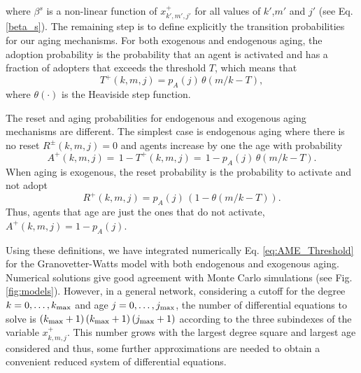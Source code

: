 where $\beta^s$ is a non-linear function of $x^{+}_{k',m',j'}$ for all values of $k'$,$m'$ and $j'$  (see Eq. \eqref{beta_s}). The remaining step is to define explicitly the transition probabilities for our aging mechanisms. For both exogenous and endogenous aging, the adoption probability is the probability that an agent is activated and has a fraction of adopters that exceeds the threshold $T$, which means that 
\begin{equation}
T^{+}(k,m,j) = p_A(j) \, \theta(m/k - T),
\end{equation} 
where $\theta(\cdot)$ is the Heaviside step function. 

The reset and aging probabilities for endogenous and exogenous aging mechanisms are different. The simplest case is endogenous aging where there is no reset $R^{\pm} (k,m,j) = 0$ and agents increase by one the age with probability 
\begin{equation}
A^{+} (k,m,j) = \,  1 - T^{+}(k,m,j) = \, 1 - p_{A}(j)\, \theta \left( m/k - T \right).
\end{equation}
When aging is exogenous, the reset probability is the probability to activate and not adopt 
\begin{equation}
R^{+} (k,m,j) = p_A (j)\, \left(1 - \theta \left(m/k - T\right)\right). 
\end{equation}
Thus, agents that age are just the ones that do not activate, $A^{+} (k,m,j) = 1 - p_A(j)$.

Using these definitions, we have integrated numerically Eq. \eqref{eq:AME_Threshold} for the Granovetter-Watts model with both endogenous and exogenous aging. Numerical solutions give  good agreement with Monte Carlo simulations (see Fig. \ref{fig:models}). However, in a general network, considering a cutoff for the degree $k = 0,\dots,k_{\rm{max}}$ and age $j = 0,\dots,j_{\rm{max}}$, the number of differential equations to solve is $(k_{\rm{max}} + 1)\, (k_{\rm{max}} + 1)\, (j_{\rm{max}} + 1)$ according to the three subindexes of the variable $x^{+}_{k,m,j}$. This number grows with the largest degree square and largest age considered and thus, some further approximations are needed to obtain a convenient reduced system of differential equations. 

